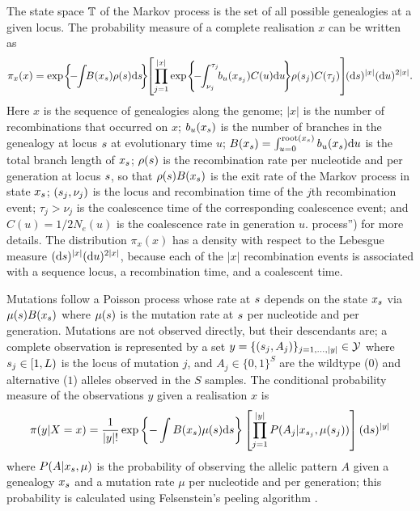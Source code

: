 The state space $\mathbb{T}$ of the Markov process is the set of all possible genealogies 
at a given locus.
The probability measure of a complete realisation $x$ can be written as 
\begin{equation}
  \pi_x( x ) =
  \exp\kern-1pt\left\{\kern-2pt -\kern-3pt \int\kern-3pt B(x_\t) \rho(\t) \d \t
    \kern-2pt \right\}\kern-3pt
  \left[
  \prod_{j=1}^{|x|} 
  \exp\kern-1pt\left\{\kern-2pt -\kern-3pt \int_{\nu_j}^{\tau_j}\kern-3pt b_u(x_{\t_j}) C(u)\d u \kern-2pt\right\}\kern-2pt
  \rho(\t_j) C(\tau_j) 
\right]\kern-3pt (\d \t)^{|x|} (\d u)^{2|x|}.
\label{eq:probx}
\end{equation}
Here $x$ is the sequence of genealogies along the genome;
$|x|$ is the number of recombinations that occurred on $x$;
$b_u(x_s)$ is the number of branches in the genealogy at locus $s$
at evolutionary time $u$;
$B(x_s)=\int_{u=0}^{\mathrm{root}(x_s)} b_u(x_s)\mathrm{d} u$ is the total branch length of $x_s$;
$\rho(s)$ is the recombination rate per nucleotide and per generation at locus $s$,
so that $\rho(s)B(x_s)$ is the exit rate of the Markov process in state $x_s$;
$(s_j,\nu_j)$ is the locus and recombination time of the $j$th recombination event;
$\tau_j>\nu_j$ is the coalescence time of the corresponding coalescence event; and
$C(u)=1/2N_e(u)$ is the coalescence rate in generation $u$.
process'') for more details.
The distribution $\pi_x(x)$ has a density with respect to the Lebesgue
measure $(\mathrm{d} s)^{|x|} (\mathrm{d} u)^{2|x|}$, because each of the $|x|$
recombination events is associated with a sequence locus,
a recombination time, and a coalescent time.

Mutations follow a Poisson process whose rate 
at $s$ depends on the state $x_s$ via
$\mu(s) B(x_s)$ where $\mu(s)$ is the
mutation rate at $s$ per nucleotide and per generation.  
Mutations are not observed directly, but their descendants are;
a complete observation is represented by a set 
$y=\{(s_j,A_j)\}_{j=1,\ldots,|y|}\in\mathcal{Y}$
where $s_j\in[1,L)$ is the locus of mutation $j$, and $A_j\in \{0,1\}^S$
are the wildtype ($0$) and
alternative ($1$) alleles observed in the $S$ samples.
The conditional probability measure of the observations $y$
given a realisation $x$ is
\begin{equation}
  \pi( y | X=x) = {1\over|y|!}
  \exp\left\{-\int B(x_s) \mu(s) \mathrm{d} s \right\} \left[
    \prod_{j=1}^{|y|} P(A_j|x_{s_j},\mu(s_j)) \right]
  ( \mathrm{d} s)^{|y|}
  \label{eq:proby}
\end{equation}
where $P(A|x_s,\mu)$ is the probability of observing the
allelic pattern $A$ given a genealogy $x_s$ and a mutation
rate $\mu$ per nucleotide and per generation; this probability
is calculated using Felsenstein's peeling algorithm \cite{Felsenstein1981}.

